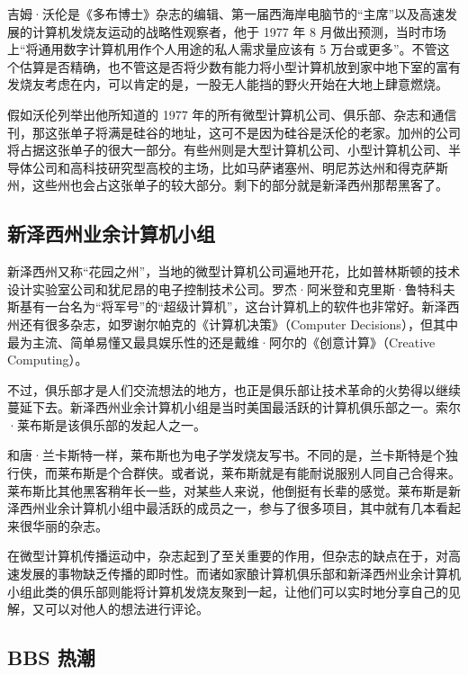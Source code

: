 \documentclass[12pt,UTF8]{ctexbook}
\begin{document}
吉姆·沃伦是《多布博士》杂志的编辑、第一届西海岸电脑节的“主席”以及高速发展的计算机发烧友运动的战略性观察者，他于 1977 年 8 月做出预测，当时市场上“将通用数字计算机用作个人用途的私人需求量应该有 5 万台或更多”。不管这个估算是否精确，也不管这是否将少数有能力将小型计算机放到家中地下室的富有发烧友考虑在内，可以肯定的是，一股无人能挡的野火开始在大地上肆意燃烧。

假如沃伦列举出他所知道的 1977 年的所有微型计算机公司、俱乐部、杂志和通信刊，那这张单子将满是硅谷的地址，这可不是因为硅谷是沃伦的老家。加州的公司将占据这张单子的很大一部分。有些州则是大型计算机公司、小型计算机公司、半导体公司和高科技研究型高校的主场，比如马萨诸塞州、明尼苏达州和得克萨斯州，这些州也会占这张单子的较大部分。剩下的部分就是新泽西州那帮黑客了。





\subsection{新泽西州业余计算机小组}


新泽西州又称“花园之州”，当地的微型计算机公司遍地开花，比如普林斯顿的技术设计实验室公司和犹尼昂的电子控制技术公司。罗杰·阿米登和克里斯·鲁特科夫斯基有一台名为“将军号”的“超级计算机”，这台计算机上的软件也非常好。新泽西州还有很多杂志，如罗谢尔帕克的《计算机决策》（Computer Decisions），但其中最为主流、简单易懂又最具娱乐性的还是戴维·阿尔的《创意计算》（Creative Computing）。

不过，俱乐部才是人们交流想法的地方，也正是俱乐部让技术革命的火势得以继续蔓延下去。新泽西州业余计算机小组是当时美国最活跃的计算机俱乐部之一。索尔·莱布斯是该俱乐部的发起人之一。

和唐·兰卡斯特一样，莱布斯也为电子学发烧友写书。不同的是，兰卡斯特是个独行侠，而莱布斯是个合群侠。或者说，莱布斯就是有能耐说服别人同自己合得来。莱布斯比其他黑客稍年长一些，对某些人来说，他倒挺有长辈的感觉。莱布斯是新泽西州业余计算机小组中最活跃的成员之一，参与了很多项目，其中就有几本看起来很华丽的杂志。

在微型计算机传播运动中，杂志起到了至关重要的作用，但杂志的缺点在于，对高速发展的事物缺乏传播的即时性。而诸如家酿计算机俱乐部和新泽西州业余计算机小组此类的俱乐部则能将计算机发烧友聚到一起，让他们可以实时地分享自己的见解，又可以对他人的想法进行评论。





\subsection{BBS 热潮}
\end{document}
